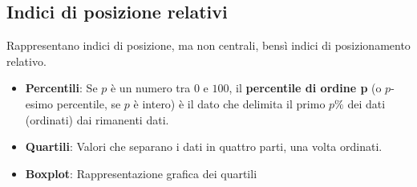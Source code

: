 \documentclass[a4paper]{article}
\theoremstyle{break}
\theoremstyle{break}
\theoremstyle{break}
\theoremstyle{break}
\begin{document}
\subsection{Indici di posizione relativi}
Rappresentano indici di posizione, ma non centrali, bensì indici di posizionamento relativo.
\begin{itemize}
	\item \textbf{Percentili}: Se \( p \) è un numero tra \( 0 \) e \( 100 \), il \textbf{percentile
		      di ordine p} (o \( p \)-esimo percentile, se \( p \) è intero) è il dato che delimita il primo
	      \( p\% \) dei dati (ordinati) dai rimanenti dati.
	      \begin{figure}[H]
		      \centering
	      \end{figure}
	\item \textbf{Quartili}: Valori che separano i dati in quattro parti, una volta ordinati.
	\item \textbf{Boxplot}: Rappresentazione grafica dei quartili
\end{itemize}
\end{document}

